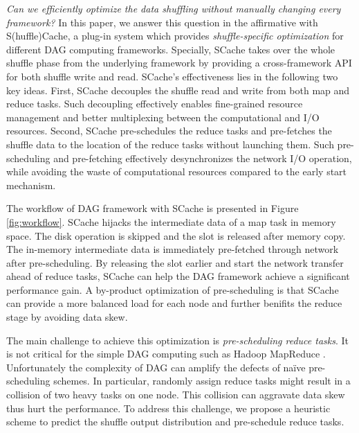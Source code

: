 \emph{Can we efficiently optimize the data shuffling without manually changing every framework?}
In this paper, we answer this question in the affirmative with S(huffle)Cache, a plug-in system which provides \emph{shuffle-specific optimization} for different DAG computing frameworks.
Specially,
SCache takes over the whole shuffle phase from the underlying framework by providing a cross-framework API for both shuffle write and read.
SCache's effectiveness lies in the following two key ideas.
First, SCache decouples the shuffle read and write from both map and reduce tasks.
Such decoupling effectively enables fine-grained resource management and better multiplexing between the computational and I/O resources.
Second,
SCache pre-schedules the reduce tasks and pre-fetches the shuffle data to the location of the reduce tasks without launching them.
Such pre-scheduling and pre-fetching effectively desynchronizes the network I/O operation, while avoiding the waste of computational resources compared to the early start mechanism.

The workflow of DAG framework with SCache is presented in Figure \ref{fig:workflow}. SCache hijacks the intermediate data of a map task in memory space. The disk operation is skipped and the slot is released after memory copy. The in-memory intermediate data is immediately pre-fetched through network after pre-scheduling. By releasing the slot earlier and start the network transfer ahead of reduce tasks, SCache can help the DAG framework achieve a significant performance gain. A by-product optimization of pre-scheduling is that SCache can provide a more balanced load for each node and further benifits the reduce stage by avoiding data skew.

The main challenge to achieve this optimization is \textit{pre-scheduling reduce tasks}. It is not critical for the simple DAG computing such as Hadoop MapReduce \cite{mapreduce}. Unfortunately the complexity of DAG can amplify the defects of na\"{i}ve pre-scheduling schemes. In particular, randomly assign reduce tasks might result in a collision of two heavy tasks on one node. This collision can aggravate data skew thus hurt the performance. To address this challenge, we propose a heuristic scheme to predict the shuffle output distribution and pre-schedule reduce tasks.

